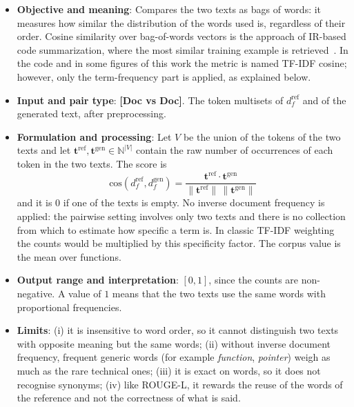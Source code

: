 \begin{itemize}[leftmargin=*, label=\textbullet]
	\item \textbf{Objective and meaning}: Compares the two texts as bags of words: it measures how
	similar the distribution of the words used is, regardless of their order. Cosine similarity over
	bag-of-words vectors is the approach of IR-based code summarization, where the most similar
	training example is retrieved~\cite{zhu_deep_2024}. In the code and in some figures of this work
	the metric is named TF-IDF cosine; however, only the term-frequency part is applied, as explained
	below.

	\item \textbf{Input and pair type}: \textbf{[Doc vs Doc]}. The token multisets of
	$d_f^{\mathrm{ref}}$ and of the generated text, after preprocessing.

	\item \textbf{Formulation and processing}: Let $V$ be the union of the tokens of the two texts
	and let $\mathbf{t}^{\mathrm{ref}},\mathbf{t}^{\mathrm{gen}}\in\mathbb{N}^{|V|}$ contain the raw
	number of occurrences of each token in the two texts. The score is
	\begin{equation}
		\mathrm{cos}(d_f^{\mathrm{ref}},d_f^{\mathrm{gen}}) =
		\frac{\mathbf{t}^{\mathrm{ref}}\cdot\mathbf{t}^{\mathrm{gen}}}
		     {\|\mathbf{t}^{\mathrm{ref}}\|\,\|\mathbf{t}^{\mathrm{gen}}\|}
		\label{eq:tf_cosine}
	\end{equation}
	and it is $0$ if one of the texts is empty. No inverse document frequency is applied: the
	pairwise setting involves only two texts and there is no collection from which to estimate how
	specific a term is. In classic TF-IDF weighting~\cite{sparckjones_statistical_1972} the counts
	would be multiplied by this specificity factor. The corpus value is the mean over functions.

	\item \textbf{Output range and interpretation}: $[0,1]$, since the counts are non-negative. A
	value of $1$ means that the two texts use the same words with proportional frequencies.

	\item \textbf{Limits}: (i) it is insensitive to word order, so it cannot distinguish two texts
	with opposite meaning but the same words; (ii) without inverse document frequency, frequent
	generic words (for example \emph{function}, \emph{pointer}) weigh as much as the rare technical
	ones; (iii) it is exact on words, so it does not recognise synonyms; (iv) like ROUGE-L, it
	rewards the reuse of the words of the reference and not the correctness of what is said.
\end{itemize}

